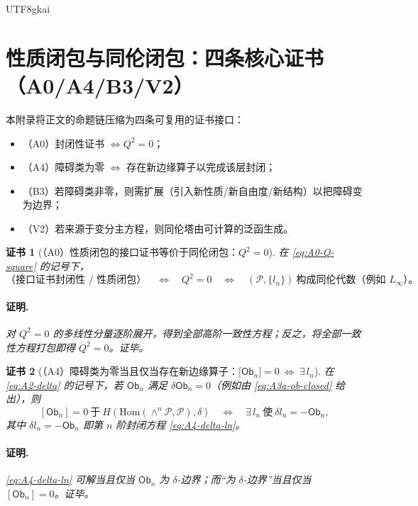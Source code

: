 \documentclass[12pt]{article}
\newtheorem{Certificate}{证书}[section]
\newcommand{\Ob}{\ensuremath{\mathsf{Ob}}}
\begin{document}
\begin{CJK*}{UTF8}{gkai}
\section{性质闭包与同伦闭包：四条核心证书（A0/A4/B3/V2）}
\label{sec:tex18-prop-vs-homotopy-certificates}

本附录将正文的命题链压缩为四条可复用的证书接口：
\begin{itemize}
  \item （A0）封闭性证书 $\Longleftrightarrow Q^2=0$；
  \item （A4）障碍类为零 $\Longleftrightarrow$ 存在新边缘算子以完成该层封闭；
  \item （B3）若障碍类非零，则需扩展（引入新性质/新自由度/新结构）以把障碍变为边界；
  \item （V2）若来源于变分主方程，则同伦塔由可计算的泛函生成。
\end{itemize}

\begin{Certificate}[（A0）性质闭包的接口证书等价于同伦闭包：$Q^2=0$]
\label{cert:tex18-A0-closure-Q2}
在 \eqref{eq:A0-Q-square} 的记号下，
\[
\text{（接口证书封闭性 / 性质闭包）}\quad\Longleftrightarrow\quad Q^2=0
\quad\Longleftrightarrow\quad (\mathcal{P},\{l_n\})\ \text{构成同伦代数（例如 }L_\infty\text{）。}
\]
\paragraph{证明.}
对 $Q^2=0$ 的多线性分量逐阶展开，得到全部高阶一致性方程；反之，将全部一致性方程打包即得 $Q^2=0$。证毕。
\end{Certificate}

\begin{Certificate}[（A4）障碍类为零当且仅当存在新边缘算子：$\lbrack \Ob_n\rbrack =0\ \Leftrightarrow\ \exists\,l_n$]
\label{cert:tex18-A4-obstruction-iff-ln}
在 \eqref{eq:A2-delta} 的记号下，若 $\Ob_n$ 满足 $\delta\Ob_n=0$（例如由 \eqref{eq:A3a-ob-closed} 给出），则
\[
[\Ob_n]=0\ \text{于}\ H\!\left(\mathrm{Hom}(\wedge^n\mathcal{P},\mathcal{P}),\delta\right)
\quad\Longleftrightarrow\quad
\exists\,l_n\ \text{使}\ \delta l_n=-\Ob_n,
\]
其中 $\delta l_n=-\Ob_n$ 即第 $n$ 阶封闭方程 \eqref{eq:A4-delta-ln}。
\paragraph{证明.}
\eqref{eq:A4-delta-ln} 可解当且仅当 $\Ob_n$ 为 $\delta$-边界；而“为 $\delta$-边界”当且仅当 $[\Ob_n]=0$。证毕。
\end{Certificate}


\end{CJK*}
\end{document}
